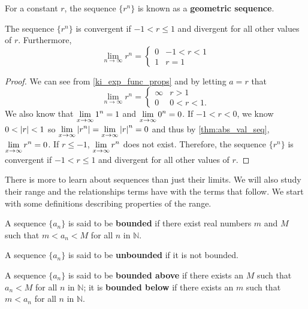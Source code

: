
\begin{definition}\label{def:geom_seq}%
For a constant $r$, the sequence $\{r^n\}$ is known as a \textbf{geometric sequence}.
\end{definition}

\begin{theorem}\label{thm:geom_seq}%
The sequence $\{r^n\}$ is convergent if $-1<r\leq 1$ and divergent for all other values of $r$.  Furthermore,
\[
\lim_{n\to \infty} r^n=\begin{cases} 
0&  -1<r<1\\
1& r=1
\end{cases}\]
\end{theorem}

\begin{proof}
We can see from \autoref{ki_exp_func_props} and by letting $a=r$ that
\[
\lim_{n\to \infty} r^n =
\begin{cases}
\infty &  r>1\\
0 & 0<r<1.
\end{cases}
\]
We also know that $\displaystyle  \lim_{x\to \infty} 1^n=1$ and $\displaystyle  \lim_{x\to \infty} 0^n=0$. If $-1<r<0$, we know $0<\left\lvert r \right\rvert<1$ so $\displaystyle \lim_{x\to \infty}\left\lvert r^n \right\rvert=\lim_{x\to \infty}\left\lvert r \right\rvert^n=0$ and thus by \autoref{thm:abs_val_seq},$\displaystyle \lim_{x\to \infty} r^n=0$. If $r\le-1$, $\displaystyle \lim_{x\to \infty} r^n$ does not exist. Therefore, the sequence $\{ r^n\}$ is convergent if $-1<r\leq 1$ and divergent for all other values of $r$.
\end{proof}



There is more to learn about sequences than just their limits. We will also study their range and the relationships terms have with the terms that follow. We start with some definitions describing properties of the range.

\begin{definition}\label{def:bounded}%
A sequence $\{a_n\}$ is said to be \textbf{bounded} if there exist real numbers $m$ and $M$ such that $m < a_n < M$ for all $n$ in $\mathbb{N}$.\bigskip

A sequence $\{a_n\}$ is said to be \textbf{unbounded} if it is not bounded.\bigskip

A sequence $\{a_n\}$ is said to be \textbf{bounded above} if there exists an $M$ such that $a_n < M$ for all $n$ in $\mathbb{N}$; it is \textbf{bounded below} if there exists an $m$ such that $m<a_n$ for all $n$ in $\mathbb{N}$.
\end{definition}

